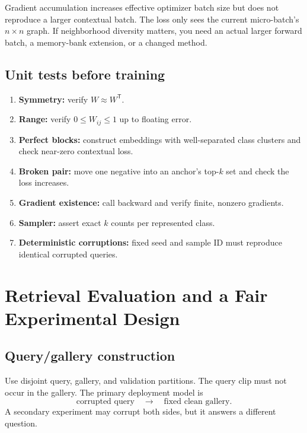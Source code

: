 \documentclass[11pt,oneside,openany]{book}
\theoremstyle{myplain}
\theoremstyle{definition}
\newcommand{\transpose}{\mathsf{T}}
\begin{document}
\begin{warningbox}[title=Important implementation trap]
Gradient accumulation increases effective optimizer batch size but does not reproduce a larger contextual batch. The loss only sees the current micro-batch's $n\times n$ graph. If neighborhood diversity matters, you need an actual larger forward batch, a memory-bank extension, or a changed method.
\end{warningbox}

\section{Unit tests before training}

\begin{enumerate}[leftmargin=*,itemsep=4pt]
  \item \textbf{Symmetry:} verify $W\approx W^\transpose$.
  \item \textbf{Range:} verify $0\le W_{ij}\le1$ up to floating error.
  \item \textbf{Perfect blocks:} construct embeddings with well-separated class clusters and check near-zero contextual loss.
  \item \textbf{Broken pair:} move one negative into an anchor's top-$k$ set and check the loss increases.
  \item \textbf{Gradient existence:} call backward and verify finite, nonzero gradients.
  \item \textbf{Sampler:} assert exact $k$ counts per represented class.
  \item \textbf{Deterministic corruptions:} fixed seed and sample ID must reproduce identical corrupted queries.
\end{enumerate}

\chapter{Retrieval Evaluation and a Fair Experimental Design}
\label{chap:evaluation}

\section{Query/gallery construction}

Use disjoint query, gallery, and validation partitions. The query clip must not occur in the gallery. The primary deployment model is
\[
\text{corrupted query}\quad\longrightarrow\quad\text{fixed clean gallery}.
\]
A secondary experiment may corrupt both sides, but it answers a different question.
\end{document}
